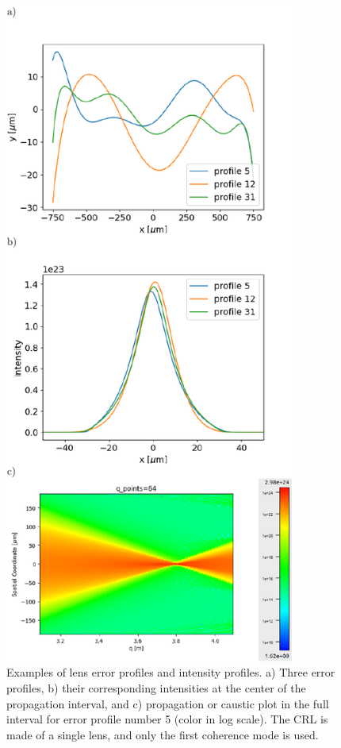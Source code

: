 \documentclass{iucr}
\begin{document}
\begin{figure}\label{fig:sample}
\includegraphics[width=0.85\textwidth]{figures/figure2.pdf}
    
    \caption{Examples of lens error profiles and intensity profiles. a) Three error profiles, b) their corresponding intensities at the center of the propagation interval, and c) propagation or caustic plot in the full interval for error profile number 5 (color in log scale). The CRL is made of a single lens, and only the first coherence mode is used.
    }
\end{figure}
\end{document}
